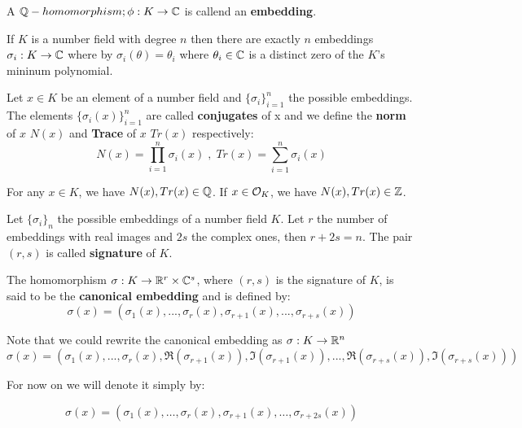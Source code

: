 \documentclass[Ingles]{ic-tese-v3}
\begin{document}
\begin{definition}
A $\mathbb{Q}-homomorphism ; \phi: K \rightarrow \mathbb{C}$ is callend an \textbf{embedding}.
\end{definition}

\begin{theorem}
 If $K$ is a number field with degree $n$ then there are
exactly $n$ embeddings $\sigma_i : K \rightarrow \mathbb{C}$ where by $\sigma_i(\theta) =
\theta_i$ where $\theta_i \in \mathbb{C}$ is a distinct zero of the $K$'s
mininum polynomial.
\end{theorem}

      \begin{definition}
  \label{def:trace-and-norm}
  Let $x \in K$ be an element of a number field and $\{\sigma_i\}_{i=1}^n$ the possible
  embeddings. The elements $\{\sigma_i(x)\}_{i=1}^n$ are called \textbf{conjugates} of
  x and we define the \textbf{norm} of $x$ $N(x)$ and \textbf{Trace} of $x$ $Tr(x)$
  respectively:
  $$
  N(x) = \prod_{i=1}^n{\sigma_i(x)} \;,\;   Tr(x) = \sum_{i=1}^n{\sigma_i(x)}
  $$

\end{definition}
\begin{theorem}[] 
  For any $x \in K$, we have $N(x), Tr(x) \in \mathbb{Q}$. If $x \in \mathcal{O}_K$, we have $N(x),
  Tr(x) \in \mathbb{Z}$.
\end{theorem}


   \begin{definition}
Let $\{\sigma_i\}_n$ the possible embeddings of a number field $K$. Let $r$ the number of embeddings with real images and $2s$ the complex ones, then
$r + 2s = n$. The pair $\left(r,s\right)$ is called \textbf{signature} of $K$.
\end{definition}

   \begin{definition}\label{def:canonical-embedding}
The homomorphism $\sigma: K \rightarrow \mathbb{R}^r \times \mathbb{C}^s$, where $(r,s)$ is the signature of $K$, is
said to be the \textbf{canonical embedding} and is defined by:
$$
\sigma(x) = \left(\sigma_1(x), ... , \sigma_r(x), \sigma_{r+1}(x), ..., \sigma_{r+s}(x) \right)
$$

Note that we could rewrite the canonical embedding as $\sigma : K \rightarrow \mathbb{R}^n$
$$
\sigma(x) = \left( \sigma_1(x), ... , \sigma_r(x), \Re(\sigma_{r+1}(x)), \Im(\sigma_{r+1}(x)), ...,
  \Re(\sigma_{r+s}(x)), \Im(\sigma_{r+s}(x)) \right)
$$

For now on we will denote it simply by:

$$
\sigma(x) = \left( \sigma_1(x), \dots , \sigma_r(x), \sigma_{r+1}(x), \dots, \sigma_{r+2s}(x) \right)
$$

\end{definition}
\end{document}
